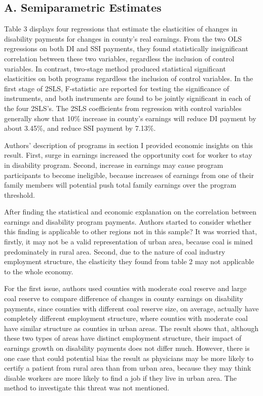 \documentclass{article} %
\begin{document}
\subsection{A. Semiparametric Estimates}
Table 3 displays four regressions that estimate the elasticities of changes in disability payments for changes in county's real earnings. From the two OLS regressions on both DI and SSI payments, they found statistically insignificant correlation between these two variables, regardless the inclusion of control variables. In contrast, two-stage method produced statistical significant elasticities on both programs regardless the inclusion of control variables. In the first stage of 2SLS, F-statistic are reported for testing the significance of instruments, and both instruments are found to be jointly significant in each of the four 2SLS's. The 2SLS coefficients from regression with control variables generally show that 10\% increase in county's earnings will reduce DI payment by about 3.45\%, and reduce SSI payment by 7.13\%. 

Authors' description of programs in section I provided economic insights on this result. First, surge in earnings increased the opportunity cost for worker to stay in disability program. Second, increase in earnings may cause program participants to become ineligible, because increases of earnings from one of their family members will potential push total family earnings over the program threshold. 

After finding the statistical and economic explanation on the correlation between earnings and disability program payments. Authors started to consider whether this finding is applicable to other regions not in this sample? It was worried that, firstly, it may not be a valid representation of urban area, because coal is mined predominately in rural area. Second, due to the nature of coal industry employment structure, the elasticity they found from table 2 may not applicable to the whole economy. %

For the first issue, authors used counties with moderate coal reserve and large coal reserve to compare difference of changes in county earnings on disability payments, since counties with different coal reserve size, on average, actually have completely different employment structure, where counties with moderate coal have similar structure as counties in urban areas. The result shows that, although these two types of areas have distinct employment structure, their impact of earnings growth on disability payments does not differ much. However, there is one case that could potential bias the result as physicians may be more likely to certify a patient from rural area than from urban area, because they may think disable workers are more likely to find a job if they live in urban area. The method to investigate this threat was not mentioned. 
\end{document}
